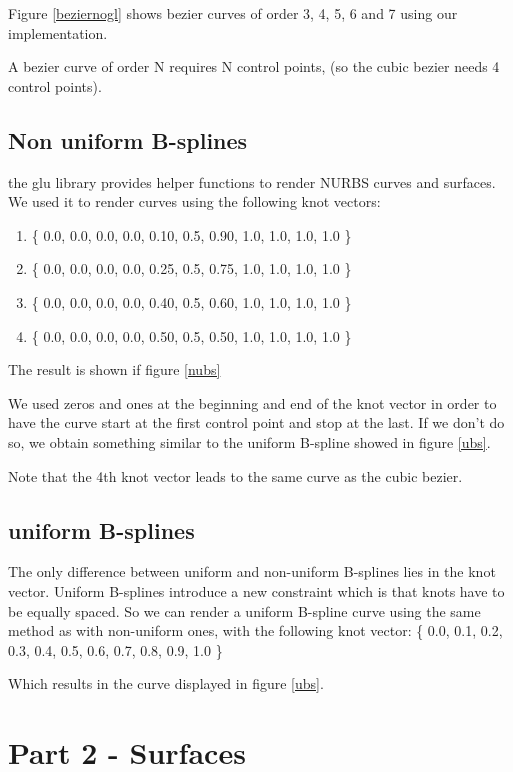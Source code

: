 Figure \ref{beziernogl} shows bezier curves of order 3, 4, 5, 6 and 7 using our implementation.

A bezier curve of order N requires N control points, (so the cubic bezier needs 4 control points). 


\subsection{Non uniform B-splines}

the glu library provides helper functions to render NURBS curves and surfaces. We
used it to render curves using the following knot vectors:
\begin{enumerate}
    \item \{ 0.0, 0.0, 0.0, 0.0, 0.10, 0.5, 0.90, 1.0, 1.0, 1.0, 1.0 \} 
    \item \{ 0.0, 0.0, 0.0, 0.0, 0.25, 0.5, 0.75, 1.0, 1.0, 1.0, 1.0 \} 
    \item \{ 0.0, 0.0, 0.0, 0.0, 0.40, 0.5, 0.60, 1.0, 1.0, 1.0, 1.0 \}
    \item \{ 0.0, 0.0, 0.0, 0.0, 0.50, 0.5, 0.50, 1.0, 1.0, 1.0, 1.0 \}
\end{enumerate}
The result is shown if figure \ref{nubs}


We used zeros and ones at the beginning and end of the knot vector in order to have
the curve start at the first control point and stop at the last. If we don't do so,
we obtain something similar to the uniform B-spline showed in figure \ref{ubs}.

Note that the 4th knot vector leads to the same curve as the cubic bezier.

\subsection{uniform B-splines}
The only difference between uniform and non-uniform B-splines lies in the knot vector.
Uniform B-splines introduce a new constraint which is that knots have to be equally
spaced. So we can render a uniform B-spline curve using the same method as with
non-uniform ones, with the following knot vector:
\{ 0.0, 0.1, 0.2, 0.3, 0.4, 0.5, 0.6, 0.7, 0.8, 0.9, 1.0 \}

Which results in the curve displayed in figure \ref{ubs}.


\section{Part 2 - Surfaces}



